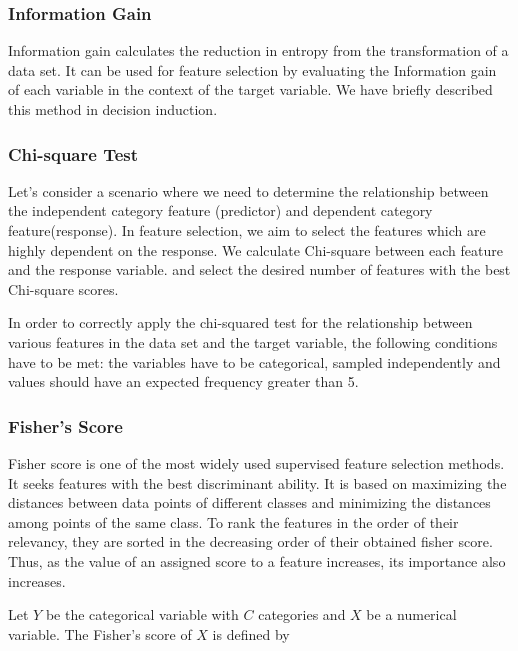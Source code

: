 \documentclass[
]{article}
\begin{document}
\hypertarget{information-gain}{%
\subsubsection{Information Gain}\label{information-gain}}

Information gain calculates the reduction in entropy from the
transformation of a data set. It can be used for feature selection by
evaluating the Information gain of each variable in the context of the
target variable. We have briefly described this method in decision
induction.

\hypertarget{chi-square-test}{%
\subsubsection{Chi-square Test}\label{chi-square-test}}

Let's consider a scenario where we need to determine the relationship
between the independent category feature (predictor) and dependent
category feature(response). In feature selection, we aim to select the
features which are highly dependent on the response. We calculate
Chi-square between each feature and the response variable. and select
the desired number of features with the best Chi-square scores.

In order to correctly apply the chi-squared test for the relationship
between various features in the data set and the target variable, the
following conditions have to be met: the variables have to be
categorical, sampled independently and values should have an expected
frequency greater than 5.

\hypertarget{fishers-score}{%
\subsubsection{Fisher's Score}\label{fishers-score}}

Fisher score is one of the most widely used supervised feature selection
methods. It seeks features with the best discriminant ability. It is
based on maximizing the distances between data points of different
classes and minimizing the distances among points of the same class. To
rank the features in the order of their relevancy, they are sorted in
the decreasing order of their obtained fisher score. Thus, as the value
of an assigned score to a feature increases, its importance also
increases.

Let \(Y\) be the categorical variable with \(C\) categories and \(X\) be
a numerical variable. The Fisher's score of \(X\) is defined by
\end{document}
